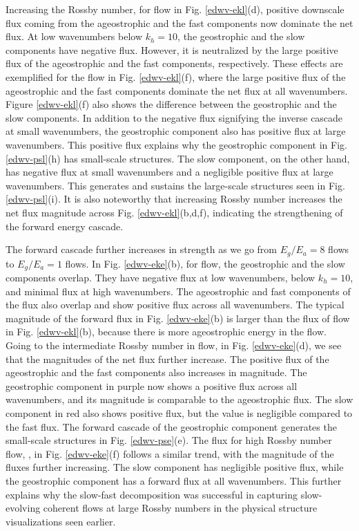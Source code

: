 \documentclass[../Rajarshi-thesis-draft.tex]{subfiles}
\begin{document}
Increasing the Rossby number, for \ire flow in Fig. \ref{edwv-ekl}(d), positive downscale flux coming from the ageostrophic and the fast components now dominate the net flux. At low wavenumbers below $k_h =10$, the geostrophic and the slow components have negative flux. However, it is neutralized by the large positive flux of the ageostrophic and the fast components, respectively. These effects are exemplified for the \hre flow in Fig. \ref{edwv-ekl}(f), where the large positive flux of the ageostrophic and the fast components dominate the net flux at all wavenumbers. Figure \ref{edwv-ekl}(f) also shows the difference between the geostrophic and the slow components. In addition to the negative flux signifying the inverse cascade at small wavenumbers, the geostrophic component also has positive flux at large wavenumbers. This positive flux explains why the geostrophic component in Fig. \ref{edwv-psl}(h) has small-scale structures. The slow component, on the other hand, has negative flux at small wavenumbers and a negligible positive flux at large wavenumbers. This generates and sustains the large-scale structures seen in  Fig. \ref{edwv-psl}(i). It is also noteworthy that increasing Rossby number increases the net flux magnitude across Fig. \ref{edwv-ekl}(b,d,f), indicating the strengthening of the forward energy cascade. 

The forward cascade further increases in strength as we go from $E_g/E_a = 8$ flows to $E_g/E_a = 1$ flows. In Fig. \ref{edwv-eke}(b), for \lro flow, the geostrophic and the slow components overlap. They have negative flux at low wavenumbers, below $k_h = 10$, and minimal flux at high wavenumbers. The ageostrophic and fast components of the flux also overlap and show positive flux across all wavenumbers. The typical magnitude of the forward flux in Fig. \ref{edwv-eke}(b) is larger than the flux of \lre flow in Fig. \ref{edwv-ekl}(b), because there is more ageostrophic energy in the \lro flow. Going to the intermediate Rossby number in \iro flow, in Fig. \ref{edwv-eke}(d), we see that the magnitudes of the net flux further increase. The positive flux of the ageostrophic and the fast components also increases in magnitude. The geostrophic component in purple now shows a positive flux across all wavenumbers, and its magnitude is comparable to the ageostrophic flux. The slow component in red also shows positive flux, but the value is negligible compared to the fast flux.  The forward cascade of the geostrophic component generates the small-scale structures in Fig. \ref{edwv-pse}(e). The flux for high Rossby number flow, \hro,  in Fig. \ref{edwv-eke}(f) follows a similar trend, with the magnitude of the fluxes further increasing. The slow component has negligible positive flux, while the geostrophic component has a forward flux at all wavenumbers. This further explains why the slow-fast decomposition was successful in capturing slow-evolving coherent flows at large Rossby numbers in the physical structure visualizations seen earlier. 
\end{document}
